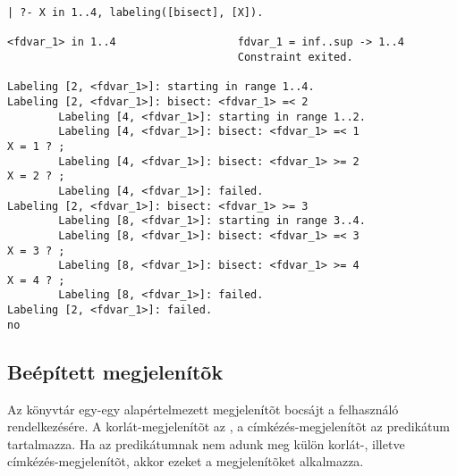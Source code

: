 \begin{verbatim}
| ?- X in 1..4, labeling([bisect], [X]).

<fdvar_1> in 1..4                   fdvar_1 = inf..sup -> 1..4
                                    Constraint exited.        

Labeling [2, <fdvar_1>]: starting in range 1..4.
Labeling [2, <fdvar_1>]: bisect: <fdvar_1> =< 2
        Labeling [4, <fdvar_1>]: starting in range 1..2.
        Labeling [4, <fdvar_1>]: bisect: <fdvar_1> =< 1     
X = 1 ? ;
        Labeling [4, <fdvar_1>]: bisect: <fdvar_1> >= 2
X = 2 ? ;
        Labeling [4, <fdvar_1>]: failed.
Labeling [2, <fdvar_1>]: bisect: <fdvar_1> >= 3
        Labeling [8, <fdvar_1>]: starting in range 3..4.
        Labeling [8, <fdvar_1>]: bisect: <fdvar_1> =< 3
X = 3 ? ;
        Labeling [8, <fdvar_1>]: bisect: <fdvar_1> >= 4
X = 4 ? ;
        Labeling [8, <fdvar_1>]: failed.
Labeling [2, <fdvar_1>]: failed.
no
\end{verbatim}

\subsection{Beépített megjelenítõk}

Az \fdbg könyvtár egy-egy alapértelmezett megjelenítõt bocsájt a felhasználó
rendelkezésére. A korlát-megjelenítõt az , a címkézés-megjelenítõt
az  predikátum tartalmazza. Ha az  predikátumnak
nem adunk meg külön korlát-, illetve címkézés-megjelenítõt, akkor ezeket a megjelenítõket
alkalmazza.

